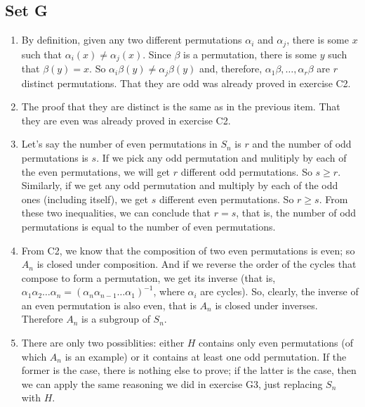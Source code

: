\documentclass{article}
\begin{document}
\subsection{Set G}
\begin{enumerate}
    \item By definition, given any two different permutations $\alpha_i$ and $\alpha_j$, there is some $x$ such that $\alpha_i(x) \ne \alpha_j(x)$. Since $\beta$ is a permutation, there is some $y$ such that $\beta(y) = x$. So $\alpha_i\beta(y) \ne \alpha_j\beta(y)$ and, therefore, $\alpha_1\beta, \ldots, \alpha_r\beta$ are $r$ distinct permutations. That they are odd was already proved in exercise C2.

    \item The proof that they are distinct is the same as in the previous item. That they are even was already proved in exercise C2.

    \item Let's say the number of even permutations in $S_n$ is $r$ and the number of odd permutations is $s$. If we pick any odd permutation and mulitiply by each of the even permutations, we will get $r$ different odd permutations. So $s \geqslant r$. Similarly, if we get any odd permutation and multiply by each of the odd ones (including itself), we get $s$ different even permutations. So $r \geqslant s$. From these two inequalities, we can conclude that $r = s$, that is, the number of odd permutations is equal to the number of even permutations.

    \item From C2, we know that the composition of two even permutations is even; so $A_n$ is closed under composition. And if we reverse the order of the cycles that compose to form a permutation, we get its inverse (that is, $\alpha_1\alpha_2\ldots\alpha_n = (\alpha_n\alpha_{n-1}\ldots\alpha_1)^{-1}$, where $\alpha_i$ are cycles). So, clearly, the inverse of an even permutation is also even, that is $A_n$ is closed under inverses. Therefore $A_n$ is a subgroup of $S_n$.

    \item There are only two possiblities: either $H$ contains only even permutations (of which $A_n$ is an example) or it contains at least one odd permutation. If the former is the case, there is nothing else to prove; if the latter is the case, then we can apply the same reasoning we did in exercise G3, just replacing $S_n$ with $H$.
\end{enumerate}
\end{document}
